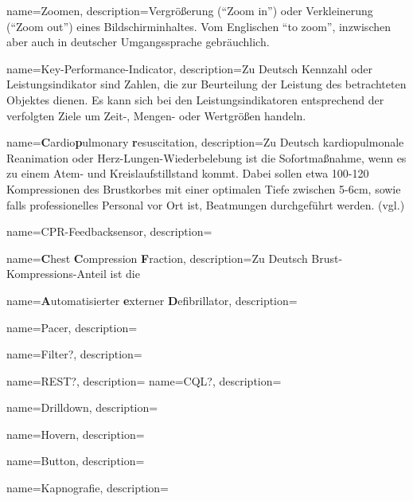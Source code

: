 

{
     name=Zoomen,
     description={Vergrößerung ("`Zoom in"') oder Verkleinerung ("`Zoom out"') eines Bildschirminhaltes. Vom Englischen "`to zoom"', inzwischen aber auch in deutscher Umgangssprache gebräuchlich.}
}

{
     name=Key-Performance-Indicator,
     description={Zu Deutsch Kennzahl oder Leistungsindikator sind \glqq Zahlen, die zur Beurteilung der Leistung des betrachteten Objektes dienen. Es kann sich bei den Leistungsindikatoren entsprechend der verfolgten Ziele um Zeit-, Mengen- oder Wertgrößen handeln.\grqq{}  \cite[S. 342, S. 3f]{Friedl.2003, Maute.2009} }
}

{
     name=\textbf{C}ardio\textbf{p}ulmonary \textbf{r}esuscitation,
     description={Zu Deutsch kardiopulmonale Reanimation oder Herz-Lungen-Wiederbelebung ist die Sofortmaßnahme, wenn es zu einem Atem- und Kreislaufstillstand kommt. Dabei sollen etwa 100-120 Kompressionen des Brustkorbes mit einer optimalen Tiefe zwischen 5-6cm, sowie falls professionelles Personal vor Ort ist, Beatmungen durchgeführt werden. (vgl.\cite{Nolan.2010, Monsieurs.2015}) }
}

{
     name=CPR-Feedbacksensor,
     description={\todo }
}

{
     name=\textbf{C}hest \textbf{C}ompression \textbf{F}raction,
     description={Zu Deutsch Brust-Kompressions-Anteil ist die \todo }
}

{
     name=\textbf{A}utomatisierter \textbf{e}xterner \textbf{D}efibrillator,
     description={\todo }
}

{
     name=Pacer,
     description={\todo }
}

{
     name=Filter?,
     description={\todo }
}

{
     name=REST?,
     description={\todo }
}
{
     name=CQL?,
     description={\todo }
}

{
     name=Drilldown,
     description={\todo }
}

{
     name=Hovern,
     description={\todo }
}

{
     name=Button,
     description={\todo }
}

{
     name=Kapnografie,
     description={\todo }
}

